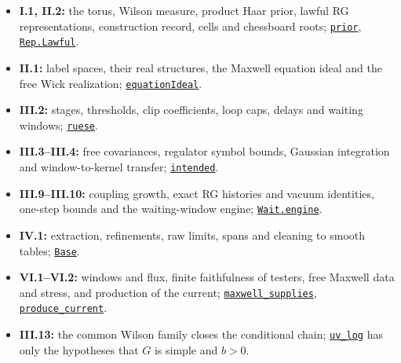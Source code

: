 \documentclass[
  letterpaper,
  11pt]{article}
\providecommand{\tightlist}{%
  \setlength{\itemsep}{0pt}\setlength{\parskip}{0pt}}
\begin{document}
\begin{itemize}
\tightlist
\item
  \textbf{I.1, II.2:} the torus, Wilson measure, product Haar prior,
  lawful RG representations, construction record, cells and chessboard
  roots;
  \href{https://github.com/yang-mills-group/OpenAI-YM-20261028/blob/3456e5e75cf8d4cd558955a5c7638fba2d68f464/YM/Wilson/Law.lean\#L55}{\texttt{prior}},
  \href{https://github.com/yang-mills-group/OpenAI-YM-20261028/blob/3456e5e75cf8d4cd558955a5c7638fba2d68f464/YM/RG/History.lean\#L181-L183}{\texttt{Rep.Lawful}}.
\item
  \textbf{II.1:} label spaces, their real structures, the Maxwell
  equation ideal and the free Wick realization;
  \href{https://github.com/yang-mills-group/OpenAI-YM-20261028/blob/3456e5e75cf8d4cd558955a5c7638fba2d68f464/YM/Maxwell/Equation.lean\#L72}{\texttt{equationIdeal}}.
\item
  \textbf{III.2:} stages, thresholds, clip coefficients, loop caps,
  delays and waiting windows;
  \href{https://github.com/yang-mills-group/OpenAI-YM-20261028/blob/3456e5e75cf8d4cd558955a5c7638fba2d68f464/YM/MergeProof/North/Expound.lean\#L68-L77}{\texttt{ruese}}.
\item
  \textbf{III.3--III.4:} free covariances, regulator symbol bounds,
  Gaussian integration and window-to-kernel transfer;
  \href{https://github.com/yang-mills-group/OpenAI-YM-20261028/blob/3456e5e75cf8d4cd558955a5c7638fba2d68f464/YM/Next/RANK/Radian/Signed.lean\#L56-L92}{\texttt{intended}}.
\item
  \textbf{III.9--III.10:} coupling growth, exact RG histories and vacuum
  identities, one-step bounds and the waiting-window engine;
  \href{https://github.com/yang-mills-group/OpenAI-YM-20261028/blob/3456e5e75cf8d4cd558955a5c7638fba2d68f464/YM/PhysicalNext/RG_NEXT_COMPLETE_REPEATABLE_NONLINEAR_STEP/Pane/Divisors.lean\#L26-L135}{\texttt{Wait.engine}}.
\item
  \textbf{IV.1:} extraction, refinements, raw limits, spans and cleaning
  to smooth tables;
  \href{https://github.com/yang-mills-group/OpenAI-YM-20261028/blob/3456e5e75cf8d4cd558955a5c7638fba2d68f464/YM/Next/EXTRACTION/Base.lean\#L42-L51}{\texttt{Base}}.
\item
  \textbf{VI.1--VI.2:} windows and flux, finite faithfulness of testers,
  free Maxwell data and stress, and production of the current;
  \href{https://github.com/yang-mills-group/OpenAI-YM-20261028/blob/3456e5e75cf8d4cd558955a5c7638fba2d68f464/YM/Next/MAXWELL/Lit.lean\#L45-L48}{\texttt{maxwell\_supplies}},
  \href{https://github.com/yang-mills-group/OpenAI-YM-20261028/blob/3456e5e75cf8d4cd558955a5c7638fba2d68f464/YM/Next/UV_STRESS/Limit.lean\#L129-L167}{\texttt{produce\_current}}.
\item
  \textbf{III.13:} the common Wilson family closes the conditional
  chain;
  \href{https://github.com/yang-mills-group/OpenAI-YM-20261028/blob/3456e5e75cf8d4cd558955a5c7638fba2d68f464/YM/SharpGram/Assembly/Flowers.lean\#L75-L130}{\texttt{uv\_log}}
  has only the hypotheses that \(G\) is simple and \(b>0\).
\end{itemize}
\end{document}
